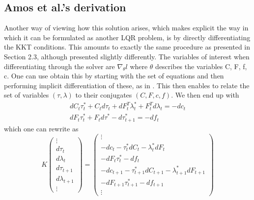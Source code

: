 \documentclass[a4paper,11pt]{article}
\begin{document}
\subsection{Amos et al.'s derivation}
Another way of viewing how this solution arises, which makes explicit the way in which it can be formulated as another LQR problem, is by directly differentiating the KKT conditions. This amounts to exactly the same procedure as presented in Section 2.3, although presented slightly differently.
The variables of interest when differentiating through the solver are $\nabla_\theta l$ where $\theta$ describes the variables C, F, f, c. One can use obtain this by starting with the set of equations  and then performing implicit differentiation of these, as in \cite{amos2017optnet}. This then enables to relate the set of variables $(\tau,\lambda)$ to their conjugates $(C,F,c,f)$.
We then end up with
%
\begin{equation}
    \begin{aligned}
        dC_t \tau_t^* + C_t d\tau_t + dF_t^T \lambda_t^* + F_t^T d\lambda_t = - dc_t
        \\ dF_t \tau_t^* + F_t d\tau^* - d\tau_{t+1}^* = -df_t
    \end{aligned}
\end{equation}
%
which one can rewrite as
%
\begin{equation}
    \label{eq:4}
    K \begin{pmatrix}
        \vdots \\
        d\tau_t
        \\d\lambda_t
        \\ d\tau_{t+1}
        \\d\lambda_{t+1}
        \\ \vdots
    \end{pmatrix} =
    \begin{pmatrix} \vdots                                                       \\
        -dc_t - \tau_t^* dC_t - \lambda_t^* dF_t                     \\
        -dF_t \tau_t^*-df_t                                          \\
        -dc_{t+1} - \tau_{t+1}^* dC_{t+1} - \lambda_{t+1}^* dF_{t+1} \\
        -dF_{t+1} \tau_{t+1}^*-df_{t+1}                              \\
        \vdots
    \end{pmatrix}
\end{equation}
\end{document}
